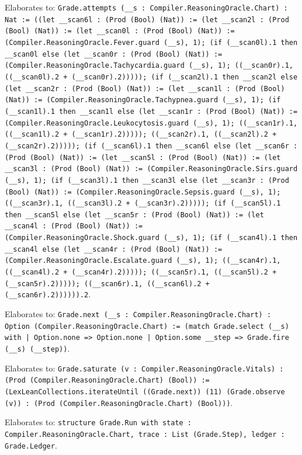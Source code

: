 \documentclass[11pt]{article}
\begin{document}
\noindent Elaborates to: \texttt{Grade.attempts (\_\_s : Compiler.ReasoningOracle.Chart) : Nat := ((let \_\_scan6l : (Prod (Bool) (Nat)) := (let \_\_scan2l : (Prod (Bool) (Nat)) := (let \_\_scan0l : (Prod (Bool) (Nat)) := (Compiler.ReasoningOracle.Fever.guard (\_\_s), 1); (if (\_\_scan0l).1 then \_\_scan0l else (let \_\_scan0r : (Prod (Bool) (Nat)) := (Compiler.ReasoningOracle.Tachycardia.guard (\_\_s), 1); ((\_\_scan0r).1, ((\_\_scan0l).2 + (\_\_scan0r).2))))); (if (\_\_scan2l).1 then \_\_scan2l else (let \_\_scan2r : (Prod (Bool) (Nat)) := (let \_\_scan1l : (Prod (Bool) (Nat)) := (Compiler.ReasoningOracle.Tachypnea.guard (\_\_s), 1); (if (\_\_scan1l).1 then \_\_scan1l else (let \_\_scan1r : (Prod (Bool) (Nat)) := (Compiler.ReasoningOracle.Leukocytosis.guard (\_\_s), 1); ((\_\_scan1r).1, ((\_\_scan1l).2 + (\_\_scan1r).2))))); ((\_\_scan2r).1, ((\_\_scan2l).2 + (\_\_scan2r).2))))); (if (\_\_scan6l).1 then \_\_scan6l else (let \_\_scan6r : (Prod (Bool) (Nat)) := (let \_\_scan5l : (Prod (Bool) (Nat)) := (let \_\_scan3l : (Prod (Bool) (Nat)) := (Compiler.ReasoningOracle.Sirs.guard (\_\_s), 1); (if (\_\_scan3l).1 then \_\_scan3l else (let \_\_scan3r : (Prod (Bool) (Nat)) := (Compiler.ReasoningOracle.Sepsis.guard (\_\_s), 1); ((\_\_scan3r).1, ((\_\_scan3l).2 + (\_\_scan3r).2))))); (if (\_\_scan5l).1 then \_\_scan5l else (let \_\_scan5r : (Prod (Bool) (Nat)) := (let \_\_scan4l : (Prod (Bool) (Nat)) := (Compiler.ReasoningOracle.Shock.guard (\_\_s), 1); (if (\_\_scan4l).1 then \_\_scan4l else (let \_\_scan4r : (Prod (Bool) (Nat)) := (Compiler.ReasoningOracle.Escalate.guard (\_\_s), 1); ((\_\_scan4r).1, ((\_\_scan4l).2 + (\_\_scan4r).2))))); ((\_\_scan5r).1, ((\_\_scan5l).2 + (\_\_scan5r).2))))); ((\_\_scan6r).1, ((\_\_scan6l).2 + (\_\_scan6r).2)))))).2}.\par
\noindent Elaborates to: \texttt{Grade.next (\_\_s : Compiler.ReasoningOracle.Chart) : Option (Compiler.ReasoningOracle.Chart) := (match Grade.select (\_\_s) with | Option.none => Option.none | Option.some \_\_step => Grade.fire (\_\_s) (\_\_step))}.\par
\noindent Elaborates to: \texttt{Grade.saturate (v : Compiler.ReasoningOracle.Vitals) : (Prod (Compiler.ReasoningOracle.Chart) (Bool)) := (LexLeanCollections.iterateUntil ((Grade.next)) (11) (Grade.observe (v)) : (Prod (Compiler.ReasoningOracle.Chart) (Bool)))}.\par
\noindent Elaborates to: \texttt{structure Grade.Run with state : Compiler.ReasoningOracle.Chart, trace : List (Grade.Step), ledger : Grade.Ledger}.\par
\end{document}
